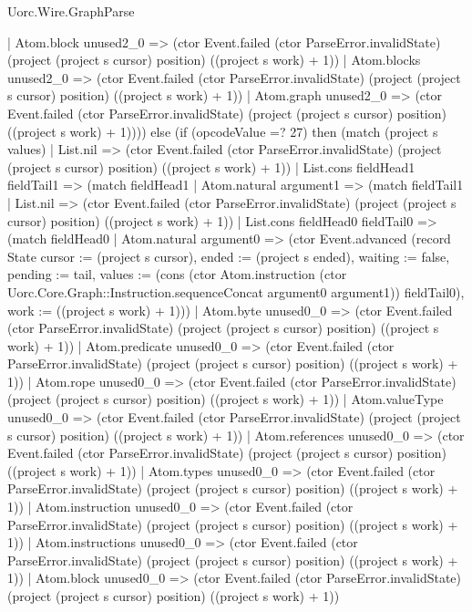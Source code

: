 \begin{lexlean}{Uorc.Wire.GraphParse}
\begin{semanticmodule}
{          | Atom.block unused2_0 => (ctor Event.failed (ctor ParseError.invalidState) (project (project s cursor) position) ((project s work) + 1))
          | Atom.blocks unused2_0 => (ctor Event.failed (ctor ParseError.invalidState) (project (project s cursor) position) ((project s work) + 1))
          | Atom.graph unused2_0 => (ctor Event.failed (ctor ParseError.invalidState) (project (project s cursor) position) ((project s work) + 1)))) else (if (opcodeValue =? 27) then (match (project s values)
        | List.nil => (ctor Event.failed (ctor ParseError.invalidState) (project (project s cursor) position) ((project s work) + 1))
        | List.cons fieldHead1 fieldTail1 => (match fieldHead1
          | Atom.natural argument1 => (match fieldTail1
            | List.nil => (ctor Event.failed (ctor ParseError.invalidState) (project (project s cursor) position) ((project s work) + 1))
            | List.cons fieldHead0 fieldTail0 => (match fieldHead0
              | Atom.natural argument0 => (ctor Event.advanced (record State {cursor := (project s cursor), ended := (project s ended), waiting := false, pending := tail, values := (cons (ctor Atom.instruction (ctor Uorc.Core.Graph::Instruction.sequenceConcat argument0 argument1)) fieldTail0), work := ((project s work) + 1)}))
              | Atom.byte unused0_0 => (ctor Event.failed (ctor ParseError.invalidState) (project (project s cursor) position) ((project s work) + 1))
              | Atom.predicate unused0_0 => (ctor Event.failed (ctor ParseError.invalidState) (project (project s cursor) position) ((project s work) + 1))
              | Atom.rope unused0_0 => (ctor Event.failed (ctor ParseError.invalidState) (project (project s cursor) position) ((project s work) + 1))
              | Atom.valueType unused0_0 => (ctor Event.failed (ctor ParseError.invalidState) (project (project s cursor) position) ((project s work) + 1))
              | Atom.references unused0_0 => (ctor Event.failed (ctor ParseError.invalidState) (project (project s cursor) position) ((project s work) + 1))
              | Atom.types unused0_0 => (ctor Event.failed (ctor ParseError.invalidState) (project (project s cursor) position) ((project s work) + 1))
              | Atom.instruction unused0_0 => (ctor Event.failed (ctor ParseError.invalidState) (project (project s cursor) position) ((project s work) + 1))
              | Atom.instructions unused0_0 => (ctor Event.failed (ctor ParseError.invalidState) (project (project s cursor) position) ((project s work) + 1))
              | Atom.block unused0_0 => (ctor Event.failed (ctor ParseError.invalidState) (project (project s cursor) position) ((project s work) + 1))
}
\end{semanticmodule}
\end{lexlean}
